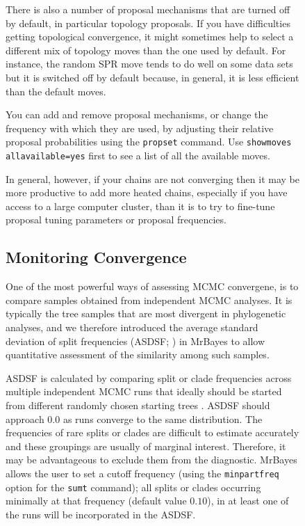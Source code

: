 \documentclass[12pt]{book}
\newcommand{\ttt}[1]{\texttt{#1}}
\begin{document}
\begin{figure}[h]
There is also a number of proposal mechanisms that are turned off by default, in particular
topology proposals. If you have difficulties getting topological convergence, it might sometimes
help to select a different mix of topology moves than the one used by default. For instance, the
random SPR move tends to do well on some data sets but it is switched off by default because, in
general, it is less efficient than the default moves.

You can add and remove proposal mechanisms, or change the frequency with which they are used, by
adjusting their relative proposal probabilities using the \ttt{propset} command. Use \ttt{showmoves
allavailable=yes} first to see a list of all the available moves.

In general, however, if your chains are not converging then it may be more productive to add more
heated chains, especially if you have access to a large computer cluster, than it is to try to
fine-tune proposal tuning parameters or proposal frequencies.


\subsection{Monitoring Convergence}
\label{monitoringConvergence}

One of the most powerful ways of assessing MCMC convergene, is to compare samples obtained from
independent MCMC analyses. It is typically the tree samples that are most divergent in phylogenetic
analyses, and we therefore introduced the average standard deviation of split frequencies (ASDSF;
\citep{lakner08}) in MrBayes to allow quantitative assessment of the similarity among such samples.

ASDSF is calculated by comparing split or clade frequencies across multiple independent MCMC runs
that ideally should be started from different randomly chosen starting trees \citep{lakner08}.
ASDSF should approach $0.0$ as runs converge to the same distribution. The frequencies of rare
splits or clades are difficult to estimate accurately and these groupings are usually of marginal
interest. Therefore, it may be advantageous to exclude them from the diagnostic. MrBayes allows the
user to set a cutoff frequency (using the \ttt{minpartfreq} option for the \ttt{sumt} command); all
splits or clades occurring minimally at that frequency (default value $0.10$), in at least one of
the runs will be incorporated in the ASDSF.


\end{figure}
\end{document}
